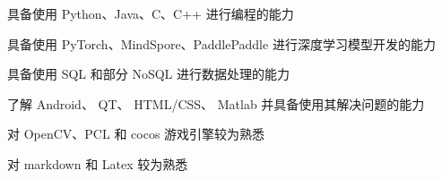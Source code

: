 

具备使用 Python、Java、C、C++ 进行编程的能力

具备使用 PyTorch、MindSpore、PaddlePaddle 进行深度学习模型开发的能力

具备使用 SQL 和部分 NoSQL 进行数据处理的能力

了解 Android、 QT、 HTML/CSS、 Matlab 并具备使用其解决问题的能力

对 OpenCV、PCL 和 cocos 游戏引擎较为熟悉

对 markdown 和 Latex 较为熟悉


